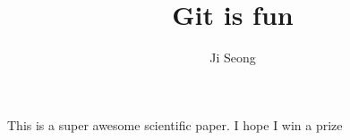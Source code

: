 \documentclass[10pt]{article}
\author{Ji Seong}
\title{Git is fun}
\begin{document}
        \maketitle

        This is a super awesome scientific paper.
        I hope I win a prize
\end{document}
